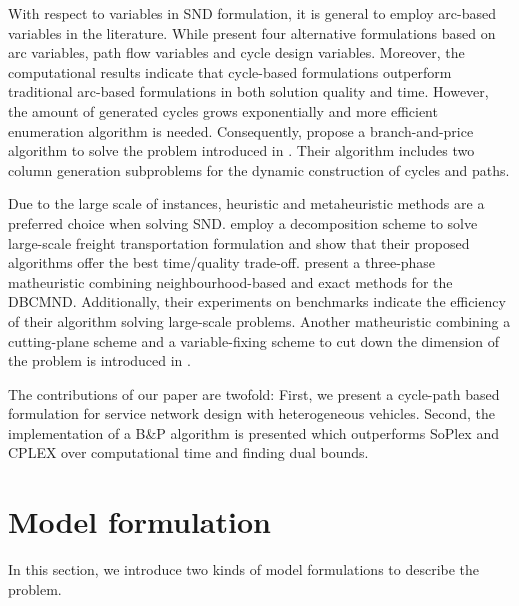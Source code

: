 \documentclass[11pt,nonblindrev,fleqn]{article}
\begin{document}
With respect to variables in SND formulation, it is general to employ arc-based variables in the literature. While \cite{Andersen2009bService} present four alternative formulations based on arc variables, path flow variables and cycle design variables. Moreover, the computational results indicate that cycle-based formulations outperform traditional arc-based formulations in both solution quality and time. However, the amount of generated cycles grows exponentially and more efficient enumeration algorithm is needed. Consequently, \cite{Andersen2011Branch} propose a branch-and-price algorithm to solve the problem introduced in \cite{Andersen2009aService}. Their algorithm includes two column generation subproblems for the dynamic construction of cycles and paths.

Due to the large scale of instances, heuristic and metaheuristic methods are a preferred choice when solving SND. \cite{Teypaz2010A} employ a decomposition scheme to solve large-scale freight transportation formulation and show that their proposed algorithms offer the best time/quality trade-off. \cite{VuDucToulouse} present a three-phase matheuristic combining neighbourhood-based and exact methods for the DBCMND. Additionally, their experiments on benchmarks indicate the efficiency of their algorithm solving large-scale problems. Another matheuristic combining a cutting-plane scheme and a variable-fixing scheme to cut down the dimension of the problem is introduced in \cite{Chouman2015Cutting}.

The contributions of our paper are twofold: First, we present a cycle-path based formulation for service network design with heterogeneous vehicles. Second, the implementation of a B\&P algorithm is presented which outperforms SoPlex and CPLEX over computational time and finding dual bounds.

\section{Model formulation}
In this section, we introduce two kinds of model formulations to describe the problem.
\end{document}
